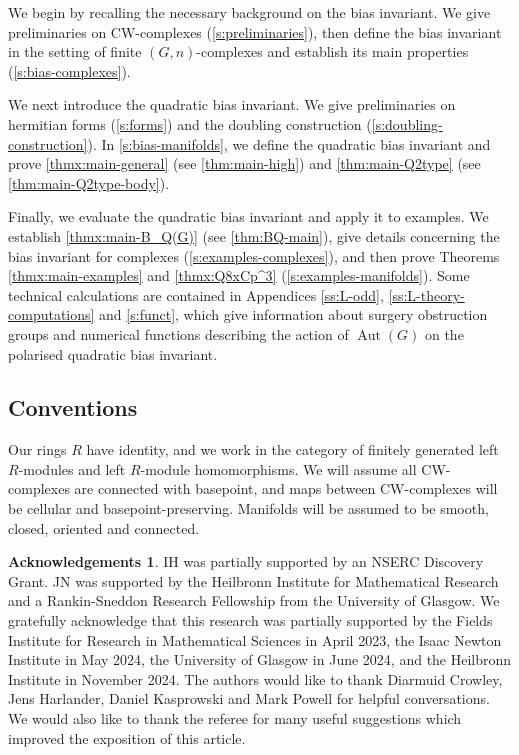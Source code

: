 \documentclass[11pt,a4paper,leqno]{amsart}
\theoremstyle{definition}
\newtheorem*{acknowledgement*}{Acknowledgements}
\theoremstyle{remark}
\DeclareMathOperator{\Aut}{Aut}
\begin{document}
We begin by recalling the necessary background on the bias invariant. We give preliminaries on CW-complexes (\cref{s:preliminaries}), then define the bias invariant in the setting of finite $(G,n)$-complexes and establish its main properties (\cref{s:bias-complexes}).

We next introduce the quadratic bias invariant. We give preliminaries on hermitian forms (\cref{s:forms}) and the doubling construction (\cref{s:doubling-construction}).
In \cref{s:bias-manifolds}, we define the quadratic bias invariant and prove \cref{thmx:main-general} (see \cref{thm:main-high}) and \cref{thm:main-Q2type} (see \cref{thm:main-Q2type-body}).

Finally, we evaluate the quadratic bias invariant and apply it to examples. We establish \cref{thmx:main-B_Q(G)} (see \cref{thm:BQ-main}), give details concerning the bias invariant for complexes (\cref{s:examples-complexes}), and then prove Theorems \ref{thmx:main-examples} and \ref{thmx:Q8xCp^3} (\cref{s:examples-manifolds}).
Some technical calculations are contained in Appendices \ref{ss:L-odd}, \ref{ss:L-theory-computations} and \ref{s:funct}, which give information about surgery obstruction groups and numerical functions describing the action of $\Aut(G)$ on the polarised quadratic bias invariant.

\subsection*{Conventions}

Our rings $R$ have identity, and we work in the category of 
 finitely generated left $R$-modules and left $R$-module homomorphisms.
We will assume all CW-complexes are connected with basepoint, and 
maps between CW-complexes will be cellular and basepoint-preserving.
Manifolds will be assumed to be smooth, closed, oriented and connected.

\begin{acknowledgement*} 

IH was partially supported by an NSERC Discovery Grant.
JN was supported by the Heilbronn Institute for Mathematical Research and a Rankin-Sneddon Research Fellowship from the University of Glasgow.
We gratefully acknowledge that this research was partially supported by the Fields Institute for Research in Mathematical Sciences in April 2023, the Isaac Newton Institute in May 2024, the University of Glasgow in June 2024, and the Heilbronn Institute in November 2024. The authors would like to thank Diarmuid Crowley, Jens Harlander, Daniel Kasprowski and Mark Powell for helpful conversations.  We would also like to thank the referee for many useful suggestions which improved the exposition of this article.
\end{acknowledgement*} 
\end{document}
